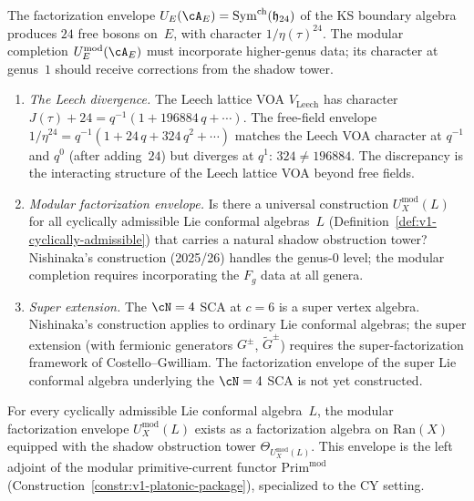 \begin{openproblem}
\label{op:programme-f-factorization-envelope}
The factorization envelope $U_E(\cA_E) =
\mathrm{Sym}^{\mathrm{ch}}(\mathfrak{h}_{24})$ of the
KS boundary algebra produces $24$ free bosons on~$E$,
with character $1/\eta(\tau)^{24}$. The modular
completion $U_E^{\mathrm{mod}}(\cA_E)$ must incorporate
higher-genus data; its character at genus~$1$ should
receive corrections from the shadow tower.
\begin{enumerate}[label=\textup{(F\arabic*)}]
\item \emph{The Leech divergence.} The Leech lattice
 VOA $V_{\mathrm{Leech}}$ has character
 $J(\tau) + 24 = q^{-1}(1 + 196884\,q + \cdots)$.
 The free-field envelope $1/\eta^{24}
 = q^{-1}(1 + 24\,q + 324\,q^2 + \cdots)$ matches
 the Leech VOA character at $q^{-1}$ and $q^0$
 (after adding~$24$) but diverges at $q^1$:
 $324 \neq 196884$. The discrepancy is the interacting
 structure of the Leech lattice VOA beyond free fields.
\item \emph{Modular factorization envelope.} Is there a
 universal construction
 $U_X^{\mathrm{mod}}(L)$ for all cyclically admissible
 Lie conformal algebras~$L$
 (Definition~\ref{def:v1-cyclically-admissible}) that
 carries a natural shadow obstruction tower? Nishinaka's
 construction (2025/26) handles the genus-$0$ level;
 the modular completion requires incorporating the
 $F_g$ data at all genera.
\item \emph{Super extension.} The $\cN = 4$ SCA at
 $c = 6$ is a super vertex algebra. Nishinaka's
 construction applies to ordinary Lie conformal algebras;
 the super extension (with fermionic generators $G^\pm$,
 $\widetilde{G}^\pm$) requires the super-factorization
 framework of Costello--Gwilliam. The factorization
 envelope of the super Lie conformal algebra underlying
 the $\cN = 4$ SCA is not yet constructed.
\end{enumerate}
\end{openproblem}

\begin{conjecture}
\label{conj:modular-fact-envelope}
\ClaimStatusConjectured\quad
For every cyclically admissible Lie conformal algebra~$L$,
the modular factorization envelope
$U_X^{\mathrm{mod}}(L)$ exists as a factorization algebra
on $\mathrm{Ran}(X)$ equipped with the shadow obstruction
tower $\Theta_{U_X^{\mathrm{mod}}(L)}$. This envelope
is the left adjoint of the modular primitive-current functor
$\mathrm{Prim}^{\mathrm{mod}}$
\textup{(}Construction~\textup{\ref{constr:v1-platonic-package})},
specialized to the CY setting.
\end{conjecture}


